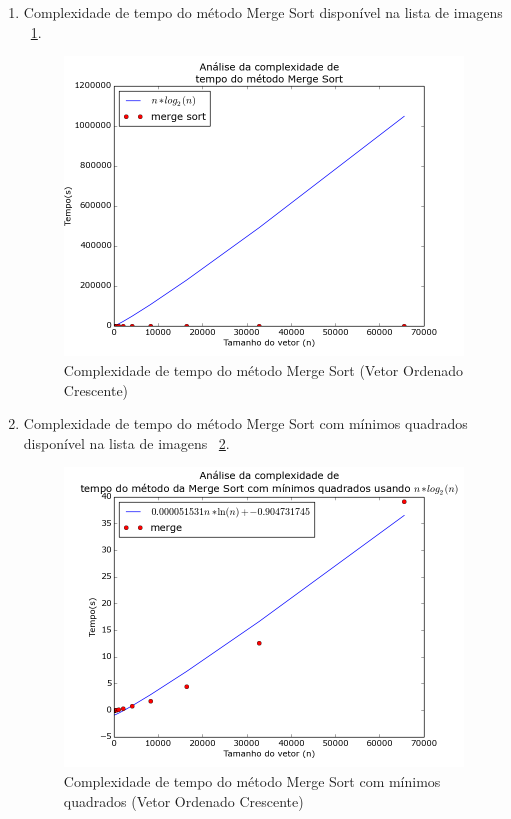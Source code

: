 \documentclass[12pt,a4paper,twoside]{report}
\begin{document}
\begin{enumerate}
\begin{enumerate}
			\item Complexidade de tempo do método Merge Sort disponível na lista de imagens ~\ref{fig:MergePlot2OC}.
			\begin{figure}[!h]
				\centering
				\includegraphics[scale=0.6]{../imagens/Merge/merge_plot_2_ordenado_crescente.png}
				\caption{Complexidade de tempo do método Merge Sort (Vetor Ordenado Crescente) \label{fig:MergePlot2OC}}
			\end{figure}


			\item Complexidade de tempo do método Merge Sort com mínimos quadrados disponível na lista de imagens ~\ref{fig:MergePlot3OC}.
			\begin{figure}[!h]
				\centering
				\includegraphics[scale=0.6]{../imagens/Merge/merge_plot_3_ordenado_crescente.png}
				\caption{Complexidade de tempo do método Merge Sort com mínimos quadrados (Vetor Ordenado Crescente) \label{fig:MergePlot3OC}}
			\end{figure}


\end{enumerate}
\end{enumerate}
\end{document}
